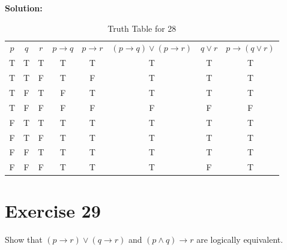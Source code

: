 \documentclass{Axon}
\begin{document}
\noindent
\textbf{Solution:}
\begin{table}[ht]
    \centering
    \begin{tabular}{c|c|c|c|c|c|c|c}
        \(p\) & \(q\) & \(r\) & \(p \to q\) & \(p \to r\) & \((p \to q) \lor (p \to r)\) & \(q \lor r\) & \(p \to (q \lor r)\) \\
        T     & T     & T     & T           & T           & T                            & T            & T                    \\
        T     & T     & F     & T           & F           & T                            & T            & T                    \\
        T     & F     & T     & F           & T           & T                            & T            & T                    \\
        T     & F     & F     & F           & F           & F                            & F            & F                    \\
        F     & T     & T     & T           & T           & T                            & T            & T                    \\
        F     & T     & F     & T           & T           & T                            & T            & T                    \\
        F     & F     & T     & T           & T           & T                            & T            & T                    \\
        F     & F     & F     & T           & T           & T                            & F            & T
    \end{tabular}
    \caption{Truth Table for 28}
\end{table}

\section*{Exercise 29}
Show that \((p \to r) \lor (q \to r)\) and \((p \land q) \to r\) are logically equivalent.
\end{document}
